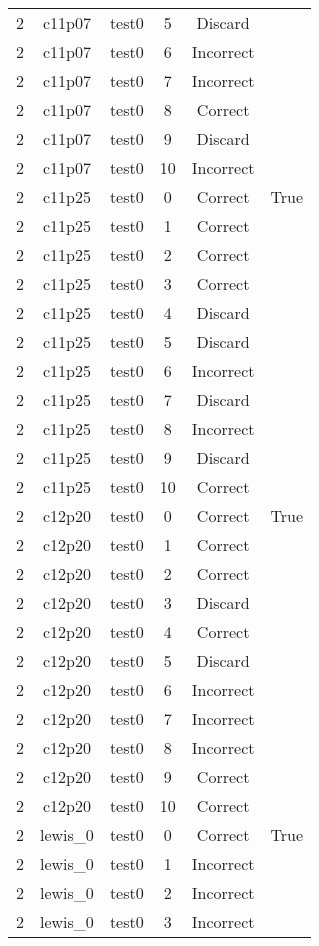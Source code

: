 \begin{longtable}{|c|c|c|c|c|c|}
2 & c11p07 & test0 & 5 & Discard &  \\ 
2 & c11p07 & test0 & 6 & Incorrect &  \\ 
2 & c11p07 & test0 & 7 & Incorrect &  \\ 
2 & c11p07 & test0 & 8 & Correct &  \\ 
2 & c11p07 & test0 & 9 & Discard &  \\ 
2 & c11p07 & test0 & 10 & Incorrect &  \\ 
2 & c11p25 & test0 & 0 & Correct & True \\ 
2 & c11p25 & test0 & 1 & Correct &  \\ 
2 & c11p25 & test0 & 2 & Correct &  \\ 
2 & c11p25 & test0 & 3 & Correct &  \\ 
2 & c11p25 & test0 & 4 & Discard &  \\ 
2 & c11p25 & test0 & 5 & Discard &  \\ 
2 & c11p25 & test0 & 6 & Incorrect &  \\ 
2 & c11p25 & test0 & 7 & Discard &  \\ 
2 & c11p25 & test0 & 8 & Incorrect &  \\ 
2 & c11p25 & test0 & 9 & Discard &  \\ 
2 & c11p25 & test0 & 10 & Correct &  \\ 
2 & c12p20 & test0 & 0 & Correct & True \\ 
2 & c12p20 & test0 & 1 & Correct &  \\ 
2 & c12p20 & test0 & 2 & Correct &  \\ 
2 & c12p20 & test0 & 3 & Discard &  \\ 
2 & c12p20 & test0 & 4 & Correct &  \\ 
2 & c12p20 & test0 & 5 & Discard &  \\ 
2 & c12p20 & test0 & 6 & Incorrect &  \\ 
2 & c12p20 & test0 & 7 & Incorrect &  \\ 
2 & c12p20 & test0 & 8 & Incorrect &  \\ 
2 & c12p20 & test0 & 9 & Correct &  \\ 
2 & c12p20 & test0 & 10 & Correct &  \\ 
2 & lewis\_0 & test0 & 0 & Correct & True \\ 
2 & lewis\_0 & test0 & 1 & Incorrect &  \\ 
2 & lewis\_0 & test0 & 2 & Incorrect &  \\ 
2 & lewis\_0 & test0 & 3 & Incorrect &  \\ 

\end{longtable}
